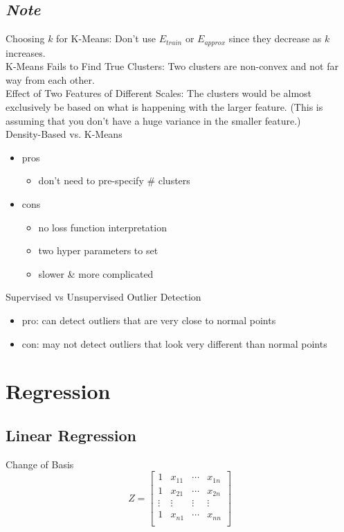 \documentclass[10pt,landscape,a4paper]{article}
\begin{document}
\begin{multicols*}{5}
\subsection{\emph{Note}}
Choosing \(k\) for K-Means: Don't use \(E_{train}\) or \(E_{approx}\) since they decrease as \(k\) increases. \\
K-Means Fails to Find True Clusters: Two clusters are non-convex and not far way from each other. \\
Effect of Two Features of Different Scales: The clusters would be almost exclusively be based on what is happening with the larger feature. (This is assuming that you don't have a huge variance in the smaller feature.) \\
Density-Based vs. K-Means
\begin{itemize}
    \item pros
    \begin{itemize}
        \item don't need to pre-specify \# clusters
    \end{itemize}
    \item cons
    \begin{itemize}
        \item no loss function interpretation
        \item two hyper parameters to set
        \item slower \& more complicated
    \end{itemize}
\end{itemize}
Supervised vs Unsupervised Outlier Detection
\begin{itemize}
    \item pro: can detect outliers that are very close to normal points
    \item con: may not detect outliers that look very different than normal points
\end{itemize}

\section{Regression}

\subsection{Linear Regression}
Change of Basis
\begin{dmath*}
    Z =
    \begin{bmatrix}
        1 & x_{11} & \cdots & x_{1n} \\
        1 & x_{21} & \cdots & x_{2n} \\
        \vdots & \vdots & \vdots & \vdots \\
        1 & x_{n1} & \cdots & x_{nn} \\
    \end{bmatrix}
\end{dmath*}


\end{multicols*}
\end{document}
